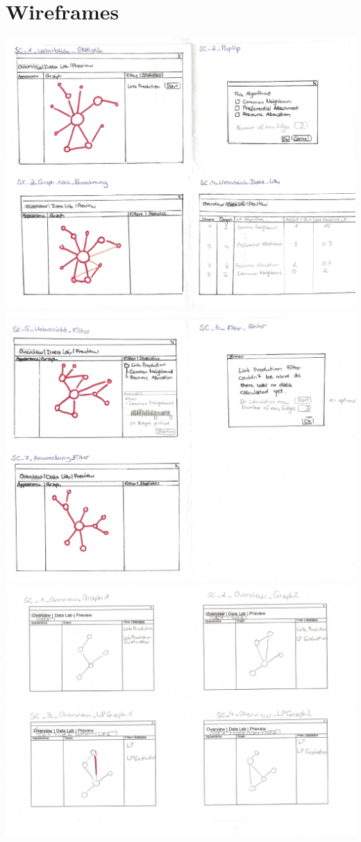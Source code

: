 \section{Wireframes}
\label{wireframes}
\includegraphics[width=\textwidth]{resources/wirefames-pt1.png}
\includegraphics[width=\textwidth]{resources/wirefames-pt2.png}
\newpage
\includegraphics[width=\textwidth]{resources/wirefames-pt3.png}

